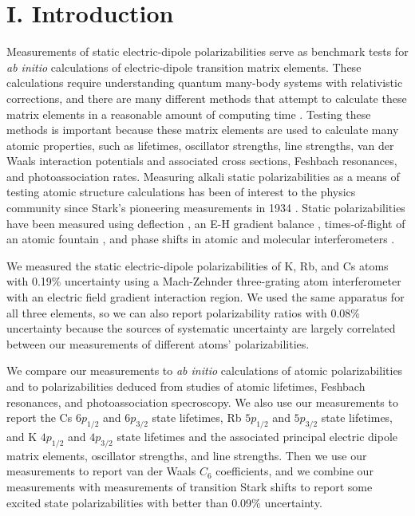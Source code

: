 \documentclass[twocolumn,pra,showpacs,superscriptaddress,longbibliography]{revtex4-1}   %
\begin{document}



\maketitle



\section{I. Introduction}

Measurements of static electric-dipole polarizabilities serve as benchmark tests for \textit{ab initio} calculations of electric-dipole transition matrix elements. 
These calculations require understanding quantum many-body systems with relativistic corrections, and there are many different methods that attempt to calculate these matrix elements in a reasonable amount of computing time \cite{Mitroy2010}. Testing these methods is important because these matrix elements are used to calculate many atomic properties, such as lifetimes, oscillator strengths, line strengths, van der Waals interaction potentials and associated cross sections, Feshbach resonances, and photoassociation rates.
Measuring alkali static polarizabilities as a means of testing atomic 
structure calculations has been of interest to the physics community since
Stark's pioneering measurements in 1934 \cite{Scheffers1934}. Static polarizabilities have been measured using deflection \cite{Scheffers1934,Chamberlain1963,Hall1974,Ma2015}, an E-H gradient
balance \cite{Salop1961,Molof1974a}, times-of-flight of an atomic fountain \cite{Amini2003}, and phase shifts in atomic and molecular interferometers
\cite{Ekstrom1995,Miffre2006,Holmgren2010,Berninger2007}.

We measured the static electric-dipole polarizabilities of K, Rb, and Cs atoms with 0.19\% uncertainty using a Mach-Zehnder three-grating atom interferometer \cite{Berman1997,Cronin2009} with an electric field gradient interaction region. We used the same apparatus for all three elements, so we can also report polarizability ratios with 0.08\% uncertainty because the sources of systematic uncertainty are largely correlated between our measurements of different atoms' polarizabilities. 

We compare our measurements to
\textit{ab initio} calculations of atomic polarizabilities and to polarizabilities deduced from studies of atomic lifetimes, Feshbach resonances, and photoassociation specroscopy. We also use our measurements to report the Cs $6p_{1/2}$ and $6p_{3/2}$ state lifetimes, Rb $5p_{1/2}$ and $5p_{3/2}$ state lifetimes, and K $4p_{1/2}$ and $4p_{3/2}$ state lifetimes and the associated principal electric dipole matrix elements, oscillator strengths, and line strengths. 
Then we use our measurements to report van der Waals $C_6$ coefficients,
and we combine our measurements with measurements of 
transition Stark shifts to report some excited state polarizabilities with better than 0.09\% uncertainty.
\end{document}
